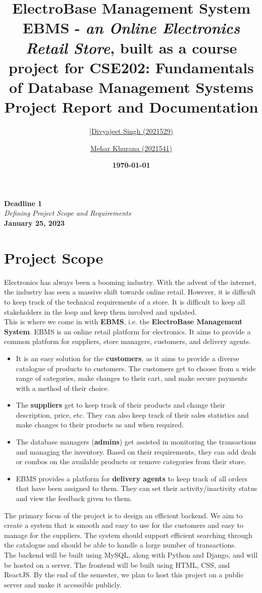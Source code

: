 \documentclass[12pt]{report}
\title{
    \textbf{\Huge ElectroBase Management System} \\
    \vspace*{15pt}
    \large{
        EBMS - \textit{an Online Electronics Retail Store}, built as a course project for
        \normalsize{CSE202: Fundamentals of Database Management Systems} \\
    }
    \vspace*{20pt}
    \textbf{\Large Project Report and Documentation}
}
\author{
    \href{mailto:divyajeet21529@iiitd.ac.in}{]Divyajeet Singh (2021529)}
    \and
    \href{mailto:mehar21541@iiitd.ac.in}{Mehar Khurana (2021541)}
}
\date{\vspace*{10pt} \textbf{\today}}
\newcommand{\deadline}[3]{
    \hspace{0pt}
    \vfill
    \begin{center}
        \Huge \textbf{Deadline #1} \\
        \vspace*{5pt}
        \Large \textit{#2} \\
        \vspace*{25pt}
        \large \textbf{#3}
    \end{center}
    \vfill
    \pagebreak
}
\begin{document}
    \maketitle

    \deadline{1}{Defining Project Scope and Requirements}{January 25, 2023}

    \section*{\Huge Project Scope}
    \vspace*{10pt}
    Electronics has always been a booming industry.
    With the advent of the internet, the industry has seen a massive shift towards online retail.
    However, it is difficult to keep track of the technical requirements of a store.
    It is difficult to keep all stakeholders in the loop and keep them involved and updated.
    \vspace*{10pt} \\
    This is where we come in with \textbf{EBMS}, i.e. the \textbf{ElectroBase Management System}.
    EBMS is an online retail platform for electronics.
    It aims to provide a common platform for suppliers, store managers, customers, and delivery agents.
    \begin{itemize}
        \item
        It is an easy solution for the \textbf{customers}, as it aims to provide a diverse catalogue of products to customers.
        The customers get to choose from a wide range of categories, make changes to their cart, and make secure payments with a method of their choice.
        \item
        The \textbf{suppliers} get to keep track of their products and change their description, price, etc.
        They can also keep track of their sales statistics and make changes to their products as and when required.
        \item
        The database managers (\textbf{admins}) get assisted in monitoring the transactions and managing the inventory.
        Based on their requirements, they can add deals or combos on the available products or remove categories from their store.
        \item
        EBMS provides a platform for \textbf{delivery agents} to keep track of all orders that have been assigned to them.
        They can set their activity/inactivity status and view the feedback given to them.
    \end{itemize}
    The primary focus of the project is to design an efficient backend.
    We aim to create a system that is smooth and easy to use for the customers and easy to manage for the suppliers.
    The system should support efficient searching through the catalogue and should be able to handle a large number of transactions.
    \vspace*{10pt} \\
    The backend will be built using MySQL, along with Python and Django, and will be hosted on a server.
    The frontend will be built using HTML, CSS, and ReactJS.
    By the end of the semester, we plan to host this project on a public server and make it accessible publicly.
\end{document}
